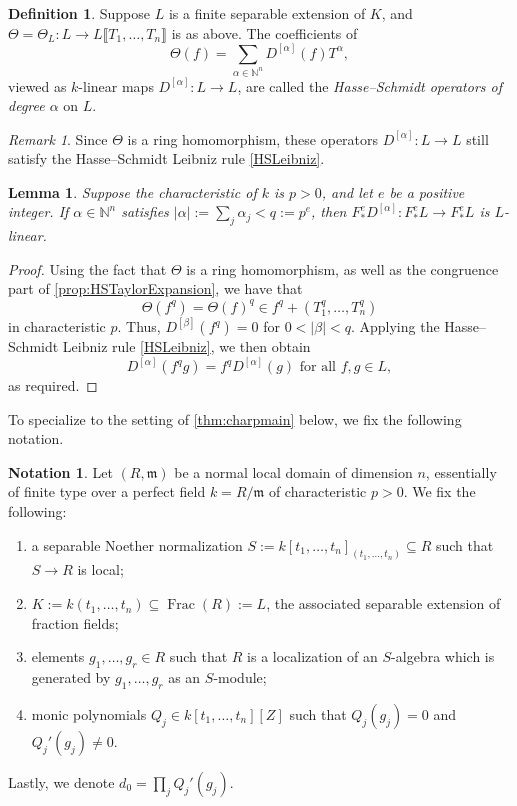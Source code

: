 \documentclass[11pt,leqno]{amsart}
\numberwithin{equation}{section}
\newtheorem{lemma}[theorem]{Lemma}
\theoremstyle{definition}
\newtheorem{definition}[theorem]{Definition}
\newtheorem{notation}[theorem]{Notation}
\theoremstyle{remark}
\newtheorem{remark}[theorem]{Remark}
\newcommand{\N}{\mathbb{N}}
\providecommand{\frm}{}
\renewcommand{\frm}{\mathfrak{m}}
\newcommand{\llb}{\llbracket}
\newcommand{\rrb}{\rrbracket}
\DeclareMathOperator{\Frac}{Frac}
\begin{document}
\begin{definition} \label{def: HasseSchmidtOperators}
Suppose $L$ is a finite separable extension of $K$, and $\Theta = \Theta_L: L \to L\llb T_1, \dots, T_n \rrb$ is as above. The coefficients of $$\Theta(f) = \sum_{\alpha \in \N^n} D^{[\alpha]} (f) T^\alpha,$$ viewed as $k$-linear maps $D^{[\alpha]}: L \to L$, are called the \textit{Hasse--Schmidt operators of degree $\alpha$} on $L$.
\end{definition}

\begin{remark}
Since $\Theta$ is a ring homomorphism, these operators $D^{[\alpha]}: L \to L$ still satisfy the Hasse--Schmidt Leibniz rule \cref{HSLeibniz}.
\end{remark}

\begin{lemma}
   \label{rem: froblinearity}
   Suppose the characteristic of $k$ is $p > 0$, and let $e$ be a positive integer. If $\alpha \in \N^n$ satisfies $|\alpha| := \sum_j \alpha_j < q := p^e$, then $F^e_*D^{[\alpha]}: F^e_* L \to F^e_*L$ is $L$-linear.
\end{lemma}
\begin{proof}
 Using the fact that $\Theta$ is a ring homomorphism, as well as the congruence part of \cref{prop:HSTaylorExpansion}, we have that $$\Theta(f^q) = \Theta(f)^q \in f^q + (T_1^q, \dots, T_n^q)$$ in characteristic $p$. Thus, $D^{[\beta]}(f^q) = 0$ for $0 < |\beta| < q$. Applying the Hasse--Schmidt Leibniz rule \cref{HSLeibniz}, we then obtain $$D^{[\alpha]}(f^q g) = f^q D^{[\alpha]}(g)\text{ for all } f, g \in L,$$ as required.  
\end{proof}




To specialize to the setting of \cref{thm:charpmain} below, we fix the following notation. 

\begin{notation} \label{not:setup}
Let $(R, \frm)$ be a normal local domain of dimension $n$, essentially of finite type over a perfect field $k = R/\frm$ of characteristic $p > 0$. We fix the following: \begin{enumerate}
\item a separable Noether normalization $S := k[t_1, \dots, t_n]_{(t_1, \dots, t_n)} \subseteq R$ such that $S \to R$ is local;
\item $K := k(t_1, \dots, t_n) \subseteq \Frac(R) := L$, the associated separable extension of fraction fields;
\item elements $g_1, \dots, g_r \in R$ such that $R$ is a localization of an $S$-algebra which is generated by $g_1, \dots, g_r$ as an $S$-module;
\item monic polynomials $Q_j \in k[t_1, \dots, t_n][Z]$ such that $Q_j(g_j) = 0$ and $Q_j'(g_j) \neq 0$.
\end{enumerate} Lastly, we denote $d_0 = \prod_j Q_j'(g_j)$.
\end{notation}
\end{document}
